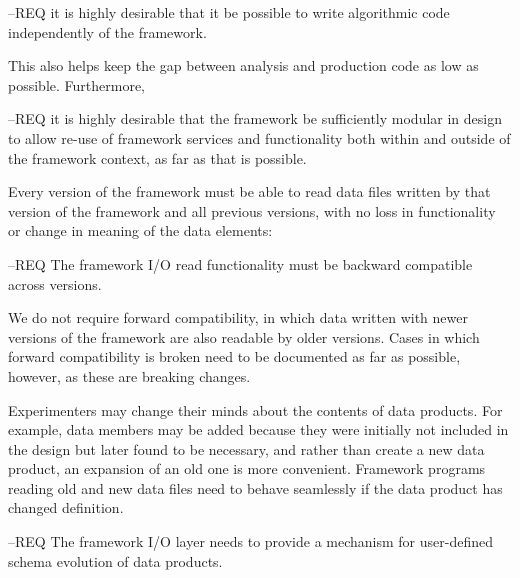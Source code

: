 \documentclass[../main-v1.tex]{subfiles}
\begin{document}
--REQ it is highly desirable that it be possible to write algorithmic code independently of the framework.

This also helps keep the gap between analysis and production code as low as possible.  Furthermore, 

--REQ it is highly desirable that the framework be sufficiently modular in design to allow re-use of framework services and functionality both within and outside of the framework context, as far as that is possible.





Every version of the framework must be able to read data files written by that version of the framework and all previous versions, with no loss in functionality or change in meaning of the data elements:

--REQ The framework I/O read functionality must be backward compatible across versions.

We do not require forward compatibility, in which data written with newer versions of the framework are also readable by older versions.  Cases in which forward compatibility is broken need to be documented as far as possible, however, as these are breaking changes.  

Experimenters may change their minds about the contents of data products.  For example, data members may be added because they were initially not included in the design but later found to be necessary, and rather than create a new data product, an expansion of an old one is more convenient.  Framework programs reading old and new data files need to behave seamlessly if the data product has changed definition.

--REQ The framework I/O layer needs to provide a mechanism for user-defined schema evolution of data products.
\end{document}
